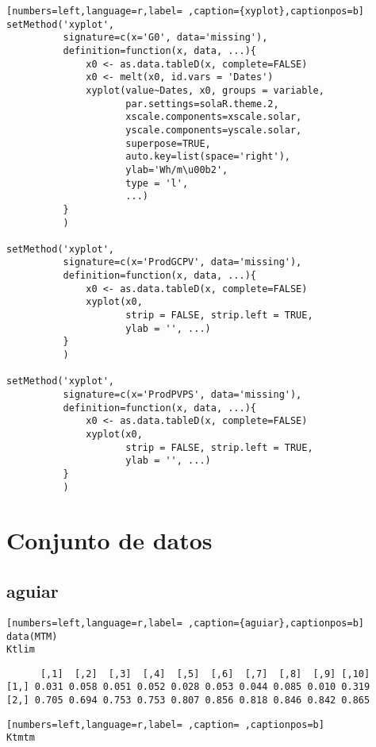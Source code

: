 \begin{lstlisting}[numbers=left,language=r,label= ,caption={xyplot},captionpos=b]
setMethod('xyplot',
          signature=c(x='G0', data='missing'),
          definition=function(x, data, ...){
              x0 <- as.data.tableD(x, complete=FALSE)              
              x0 <- melt(x0, id.vars = 'Dates')
              xyplot(value~Dates, x0, groups = variable,
                     par.settings=solaR.theme.2,
                     xscale.components=xscale.solar,
                     yscale.components=yscale.solar,
                     superpose=TRUE,
                     auto.key=list(space='right'),
                     ylab='Wh/m\u00b2',
                     type = 'l',
                     ...)     
          }
          )

setMethod('xyplot',
          signature=c(x='ProdGCPV', data='missing'),
          definition=function(x, data, ...){
              x0 <- as.data.tableD(x, complete=FALSE)
              xyplot(x0,
                     strip = FALSE, strip.left = TRUE,
                     ylab = '', ...)
          }
          )

setMethod('xyplot',
          signature=c(x='ProdPVPS', data='missing'),
          definition=function(x, data, ...){
              x0 <- as.data.tableD(x, complete=FALSE)
              xyplot(x0,
                     strip = FALSE, strip.left = TRUE,
                     ylab = '', ...)
          }
          )
\end{lstlisting}
\section{Conjunto de datos}
\label{sec:orgec036d1}
\subsection{aguiar}
\label{sec:org4b12213}
\begin{lstlisting}[numbers=left,language=r,label= ,caption={aguiar},captionpos=b]
data(MTM)
Ktlim
\end{lstlisting}

\begin{verbatim}
      [,1]  [,2]  [,3]  [,4]  [,5]  [,6]  [,7]  [,8]  [,9] [,10]
[1,] 0.031 0.058 0.051 0.052 0.028 0.053 0.044 0.085 0.010 0.319
[2,] 0.705 0.694 0.753 0.753 0.807 0.856 0.818 0.846 0.842 0.865
\end{verbatim}


\begin{lstlisting}[numbers=left,language=r,label= ,caption= ,captionpos=b]
Ktmtm
\end{lstlisting}

